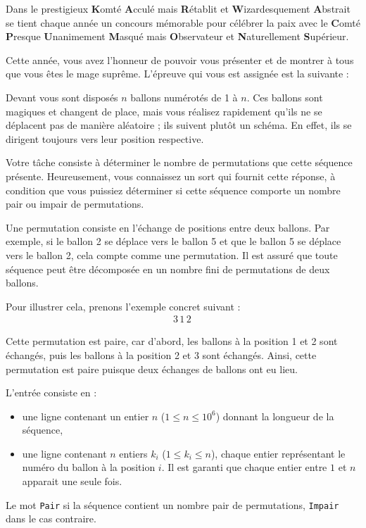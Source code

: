 \problemname{\problemyamlname}


Dans le prestigieux \textbf{K}omté \textbf{A}cculé mais \textbf{R}établit et \textbf{W}izardesquement \textbf{A}bstrait se tient chaque année un concours mémorable pour célébrer la paix avec le \textbf{C}omté \textbf{P}resque \textbf{U}nanimement \textbf{M}asqué mais \textbf{O}bservateur et \textbf{N}aturellement \textbf{S}upérieur.

Cette année, vous avez l'honneur de pouvoir vous présenter et de montrer à tous que vous êtes le mage suprême. L'épreuve qui vous est assignée est la suivante :

Devant vous sont disposés $n$ ballons numérotés de 1 à $n$. Ces ballons sont magiques et changent de place, mais vous réalisez rapidement qu'ils ne se déplacent pas de manière aléatoire ; ils suivent plutôt un schéma. En effet, ils se dirigent toujours vers leur position respective.

Votre tâche consiste à déterminer le nombre de permutations que cette séquence présente. Heureusement, vous connaissez un sort qui fournit cette réponse, à condition que vous puissiez déterminer si cette séquence comporte un nombre pair ou impair de permutations.

Une permutation consiste en l'échange de positions entre deux ballons. Par exemple, si le ballon 2 se déplace vers le ballon 5 et que le ballon 5 se déplace vers le ballon 2, cela compte comme une permutation. Il est assuré que toute séquence peut être décomposée en un nombre fini de permutations de deux ballons.

Pour illustrer cela, prenons l'exemple concret suivant :
\begin{align*}
    3\, 1\, 2\,
\end{align*}

Cette permutation est paire, car d'abord, les ballons à la position 1 et 2 sont échangés, puis les ballons à la position 2 et 3 sont échangés. Ainsi, cette permutation est paire puisque deux échanges de ballons ont eu lieu.

\begin{Input}
    L'entrée consiste en :
    \begin{itemize}
        \item une ligne contenant un entier $n$ ($1 \le n \le 10^6$) donnant la longueur de la séquence,
        \item une ligne contenant $n$ entiers $k_i $ ($1 \le k_i \le n$), chaque entier représentant le numéro du ballon à la position $i$. Il est garanti que chaque entier entre $1$ et $n$ apparait une seule fois.
    \end{itemize}
\end{Input}

\begin{Output}
    Le mot \texttt{Pair} si la séquence contient un nombre pair de permutations, \texttt{Impair} dans le cas contraire.
\end{Output}
